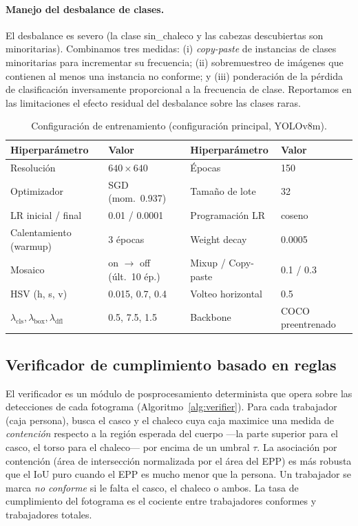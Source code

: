\documentclass{article}
\begin{document}
\paragraph{Manejo del desbalance de clases.} El desbalance es severo
(la clase \textsf{sin\_chaleco} y las cabezas descubiertas son minoritarias).
Combinamos tres medidas: (i) \emph{copy-paste} de instancias de clases
minoritarias para incrementar su frecuencia; (ii) sobremuestreo de imágenes que
contienen al menos una instancia no conforme; y (iii) ponderación de la pérdida
de clasificación inversamente proporcional a la frecuencia de clase. Reportamos
en las limitaciones el efecto residual del desbalance sobre las clases raras.

\begin{table}[t]
\centering\small
\caption{Configuración de entrenamiento (configuración principal, YOLOv8m).}
\label{tab:hparams}
\begin{tabular}{@{}llll@{}}
\toprule
Hiperparámetro & Valor & Hiperparámetro & Valor \\
\midrule
Resolución & $640\times640$ & Épocas & 150 \\
Optimizador & SGD (mom.\ 0.937) & Tamaño de lote & 32 \\
LR inicial / final & 0.01 / 0.0001 & Programación LR & coseno \\
Calentamiento (warmup) & 3 épocas & Weight decay & 0.0005 \\
Mosaico & on $\rightarrow$ off (últ.\ 10 ép.) & Mixup / Copy-paste & 0.1 / 0.3 \\
HSV (h, s, v) & 0.015, 0.7, 0.4 & Volteo horizontal & 0.5 \\
$\lambda_{\text{cls}},\lambda_{\text{box}},\lambda_{\text{dfl}}$ & 0.5, 7.5, 1.5 & Backbone & COCO preentrenado \\
\bottomrule
\end{tabular}
\end{table}

\subsection{Verificador de cumplimiento basado en reglas}
\label{sec:verifier}
El verificador es un módulo de posprocesamiento determinista que opera sobre
las detecciones de cada fotograma (Algoritmo~\ref{alg:verifier}). Para cada
trabajador (caja \textsf{persona}), busca el casco y el chaleco cuya caja
maximice una medida de \emph{contención} respecto a la región esperada del
cuerpo —la parte superior para el casco, el torso para el chaleco— por encima
de un umbral $\tau$. La asociación por contención (área de intersección
normalizada por el área del EPP) es más robusta que el IoU puro cuando el EPP
es mucho menor que la persona. Un trabajador se marca \emph{no conforme} si le
falta el casco, el chaleco o ambos. La tasa de cumplimiento del fotograma es el
cociente entre trabajadores conformes y trabajadores totales.
\end{document}
